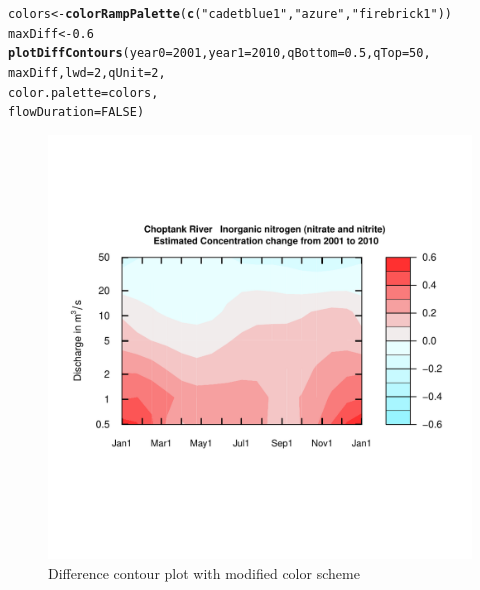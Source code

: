 \documentclass[a4paper,11pt]{article}\usepackage[]{graphicx}\usepackage[]{color}
\makeatletter
\newcommand{\hlnum}[1]{\textcolor[rgb]{0.686,0.059,0.569}{#1}}%
\newcommand{\hlstr}[1]{\textcolor[rgb]{0.192,0.494,0.8}{#1}}%
\newcommand{\hlstd}[1]{\textcolor[rgb]{0.345,0.345,0.345}{#1}}%
\newcommand{\hlkwb}[1]{\textcolor[rgb]{0.69,0.353,0.396}{#1}}%
\newcommand{\hlkwc}[1]{\textcolor[rgb]{0.333,0.667,0.333}{#1}}%
\newcommand{\hlkwd}[1]{\textcolor[rgb]{0.737,0.353,0.396}{\textbf{#1}}}%
\newenvironment{kframe}{%
 \def\at@end@of@kframe{}%
 \ifinner\ifhmode%
  \def\at@end@of@kframe{\end{minipage}}%
  \begin{minipage}{\columnwidth}%
 \fi\fi%
 \def\FrameCommand##1{\hskip\@totalleftmargin \hskip-\fboxsep
 \colorbox{shadecolor}{##1}\hskip-\fboxsep
     \hskip-\linewidth \hskip-\@totalleftmargin \hskip\columnwidth}%
 \MakeFramed {\advance\hsize-\width
   \@totalleftmargin\z@ \linewidth\hsize
   \@setminipage}}%
 {\par\unskip\endMakeFramed%
 \at@end@of@kframe}
\newenvironment{knitrout}{}{} %
\makeatother
\begin{document}
\begin{knitrout}
\color{fgcolor}\begin{kframe}
\begin{alltt}
\hlstd{colors} \hlkwb{<-} \hlkwd{colorRampPalette}\hlstd{(}\hlkwd{c}\hlstd{(}\hlstr{"cadetblue1"}\hlstd{,}\hlstr{"azure"}\hlstd{,}\hlstr{"firebrick1"}\hlstd{))}
\hlstd{maxDiff}\hlkwb{<-}\hlnum{0.6}
\hlkwd{plotDiffContours}\hlstd{(}\hlkwc{year0}\hlstd{=}\hlnum{2001}\hlstd{,}\hlkwc{year1}\hlstd{=}\hlnum{2010}\hlstd{,}\hlkwc{qBottom}\hlstd{=}\hlnum{0.5}\hlstd{,}\hlkwc{qTop}\hlstd{=}\hlnum{50}\hlstd{,}
             \hlstd{maxDiff,}\hlkwc{lwd}\hlstd{=}\hlnum{2}\hlstd{,}\hlkwc{qUnit}\hlstd{=}\hlnum{2}\hlstd{,}
             \hlkwc{color.palette}\hlstd{=colors,}
             \hlkwc{flowDuration}\hlstd{=}\hlnum{FALSE}\hlstd{)}
\end{alltt}
\end{kframe}\begin{figure}[]

\includegraphics[width=1\linewidth,height=1\linewidth]{figure/modifiedDiffContour} \caption[Difference contour plot with modified color scheme]{Difference contour plot with modified color scheme\label{fig:modifiedDiffContour}}
\end{figure}


\end{knitrout}
\end{document}
